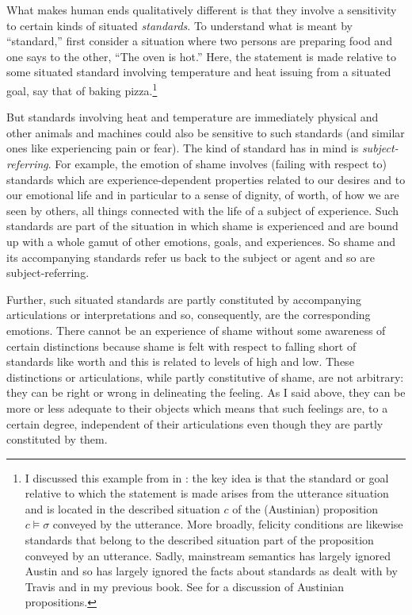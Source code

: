 What makes human ends qualitatively different is that they involve a sensitivity to certain kinds of situated \emph{standards}. To understand what is meant by ``standard,'' first consider a situation where two persons are preparing food and one says to the other, ``The oven is hot.'' Here, the statement is made relative to some situated standard involving temperature and heat issuing from a situated goal, say that of baking pizza.\footnote{I discussed this example from \citet{travis:mrt} in \citet[Section~5.6]{parikh:le}: the key idea is that the standard or goal relative to which the statement is made arises from the utterance situation and is located in the described situation $c$ of the (Austinian) proposition $c \vDash \sigma$ conveyed by the utterance. More broadly,  felicity conditions are likewise standards that belong to the described situation part of the proposition conveyed by an utterance. Sadly, mainstream semantics has largely ignored Austin and so has largely ignored the facts about standards as dealt with by Travis and in my previous book. See \citet{barwise:sftp} for a discussion of Austinian propositions.}

But standards involving heat and temperature are immediately physical and other animals and machines could also be sensitive to such standards (and similar ones like experiencing pain or fear). The kind of standard \citet[54]{taylor:sia} has in mind is \emph{subject-referring}. For example, the emotion of shame involves (failing with respect to) standards which are experience-dependent properties related to our desires and to our emotional life and in particular to a sense of dignity, of worth, of how we are seen by others, all things connected with the life of a subject of experience. Such standards are part of the situation in which shame is experienced and are bound up with a whole gamut of other emotions, goals, and experiences. So shame and its accompanying standards refer us back to the subject or agent and so are subject-referring.

Further, such situated standards are partly constituted by accompanying articulations or interpretations and so, consequently, are the corresponding emotions. There cannot be an experience of shame without some awareness of certain distinctions because shame is felt with respect to falling short of standards like worth and this is related to levels of high and low. These distinctions or articulations, while partly constitutive of shame, are not arbitrary: they can be right or wrong in delineating the feeling. As I said above, they can be more or less adequate to their objects which means that such feelings are, to a certain degree, independent of their articulations even though they are partly constituted by them.

